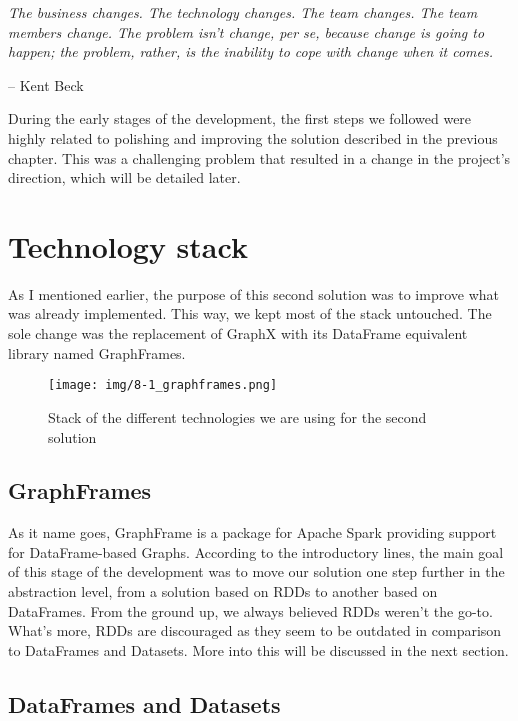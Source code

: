 \epigraph{\textit{The business changes. The technology changes. The team changes. The team members change. The problem isn't change, per se, because change is going to happen; the problem, rather, is the inability to cope with change when it comes.}}{-- \textup{Kent Beck}}

During the early stages of the development, the first steps we followed were highly related to polishing and improving the solution described in the previous chapter. This was a challenging problem that resulted in a change in the project's direction, which will be detailed later.

\section{Technology stack}

As I mentioned earlier, the purpose of this second solution was to improve what was already implemented. This way, we kept most of the stack untouched. The sole change was the replacement of GraphX with its DataFrame equivalent library named GraphFrames.

\begin{figure}[ht]
    \centering
    \texttt{[image: img/8-1\_graphframes.png]}
    \caption[Stack of the different technologies we are using for the second solution]{Stack of the different technologies we are using for the second solution\footnotemark}
\end{figure}


\subsection{GraphFrames}

As it name goes, GraphFrame is a package for Apache Spark providing support for DataFrame-based Graphs. According to the introductory lines, the main goal of this stage of the development was to move our solution one step further in the abstraction level, from a solution based on RDDs to another based on DataFrames. From the ground up, we always believed RDDs weren't the go-to. What's more, RDDs are discouraged as they seem to be outdated in comparison to DataFrames and Datasets. More into this will be discussed in the next section.

\subsection{DataFrames and Datasets}

